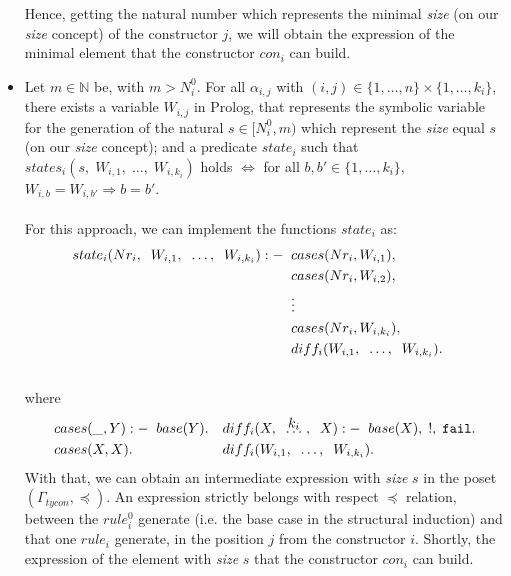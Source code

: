 \begin{itemize}
	      Hence, getting the natural number which represents the minimal \textit{size} (on our \textit{size} concept) of the constructor $j$, we will obtain the expression of the minimal element that the constructor $con_i$ can build.
	\item Let $m \in \mathbb{N}$ be, with $m > N_{i}^{0}$. For all $\alpha_{i,j}$ with $(i,j) \in \{1, \ldots, n \} \times \{1, \ldots, k_i \}$, there exists a variable $W_{i,j}$ in Prolog, that represents the symbolic variable for the generation of the natural $s \in [N_{i}^{0}, m )$ which represent the \textit{size} equal $s$ (on our \textit{size} concept); and a predicate $state_{i}$ such that $states_i(s, \; W_{i,1}, \; \ldots, \; W_{i,k_i})$ holds $\Longleftrightarrow $ for all $b,b' \in \{1, \ldots, k_i \}$,  $W_{i,b}=W_{i,b'} \Rightarrow b = b'$.\\\\
		      For this approach, we can implement the functions $state_i$ as:
		      \begin{align*}
		      	state_i(Nr_i, \;\; W_{i,1}, \;\; \ldots, \;\; W_{i, k_i}) :-
		      	  & \;\; cases(Nr_i, W_{i,1}),                          &   &   \\
		      	  & \;\; cases(Nr_i, W_{i,2}),                          &   &   \\
		      	  & \;\; \vdots                                         &   &   \\
		      	  & \;\; cases(Nr_i, W_{i,k_i}),                        &   &   \\
		      	  & \;\; diff_i(W_{i,1}, \;\; \ldots, \;\; W_{i, k_i}). &   &   \\\\
		      \end{align*}
		      where
		      \begin{align*}
		      	  & cases(\_, Y) :- \tav base(Y). &   & diff_i(X, \tav \kldots{$k_i$}\;, \tav X) :- \tav base(X), \; !, \; \ttt{fail}. \\
		      	  & cases(X, X).                  &   & diff_i(W_{i,1}, \tav \ldots, \tav W_{i, k_i}).                                 
		      \end{align*}
		      With that, we can obtain an intermediate expression with \textit{size} $s$ in the poset $(\Gamma_{tycon}, \preceq)$. An expression strictly belongs with respect $\preceq$ relation, between the $rule_{i}^{0}$ generate (i.e. the base case in the structural induction) and that one $rule_i$ generate, in the position $j$ from the constructor $i$. Shortly, the expression of the element with \textit{size} $s$ that the constructor $con_i$ can build.
	\end{itemize}
